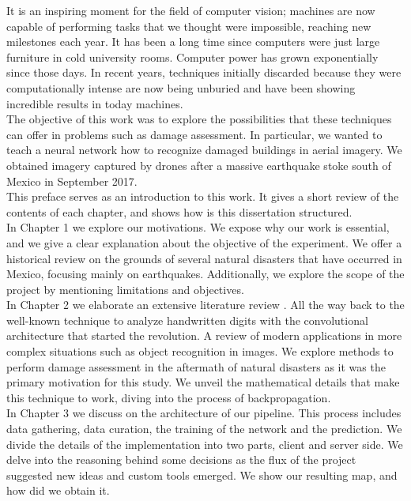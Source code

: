 It is an inspiring moment for the field of computer vision; machines are now capable of performing tasks that we thought were impossible, reaching new milestones each year. It has been a long time since computers were just large furniture in cold university rooms. Computer power has grown exponentially since those days. In recent years, techniques initially discarded because they were computationally intense are now being unburied and have been showing incredible results in today machines.\\

The objective of this work was to explore the possibilities that these techniques can offer in problems such as damage assessment. In particular, we wanted to teach a neural network how to recognize damaged buildings in aerial imagery. We obtained imagery captured by drones after a massive earthquake stoke south of Mexico in September 2017.\\

This preface serves as an introduction to this work. It gives a short review of the contents of each chapter, and shows how is this dissertation structured.\\

In Chapter 1 we explore our motivations. We expose why our work is essential, and we give a clear explanation about the objective of the experiment. We offer a historical review on the grounds of several natural disasters that have occurred in Mexico, focusing mainly on earthquakes. Additionally, we explore the scope of the project by mentioning limitations and objectives.\\

In Chapter 2 we elaborate an extensive literature review . All the way back to the well-known technique to analyze handwritten digits with the convolutional architecture that started the revolution. A review of modern applications in more complex situations such as object recognition in images. We explore methods to perform damage assessment in the aftermath of natural disasters as it was the primary motivation for this study. We unveil the mathematical details that make this technique to work, diving into the process of backpropagation.\\

In Chapter 3 we discuss on the architecture of our pipeline. This process includes data gathering, data curation, the training of the network and the prediction. We divide the details of the implementation into two parts, client and server side. We delve into the reasoning behind some decisions as the flux of the project suggested new ideas and custom tools emerged. We show our resulting map, and how did we obtain it.\\

